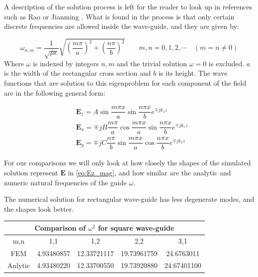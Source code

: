 A description of the solution process is left for the reader to look up in references such as Rao  \cite{Rao2004} or Jianming \cite{Jin2010}. What is found in the process is that only certain discrete frequencies are allowed inside the wave-guide, and they are given by:

\begin{equation}
\omega_{n,m} = \frac{1}{\sqrt{\mu\epsilon}}\sqrt{\left(\frac{m\pi}{a}\right)^2+\left(\frac{n\pi}{b}\right)^2}
\qquad m,n = 0,1,2,\cdots \quad (m=n\neq0)
\label{eq:eig_vals_sqare_waveguide}
\end{equation}
Where $\omega$ is indexed by integers $n,m$ and the trivial solution $\omega = 0$ is excluded. $a$ is the width of the rectangular cross section and $b$ is its height.
The wave functions that are solution to this eigenproblem for each component of the field are in the following general form:

\begin{align}
&\mathbf{E}_z = A\sin{\dfrac{m\pi x}{a}}\sin{\dfrac{n\pi x}{b}}e^{\mp jk_zz} \label{eq:Ez_mag}\\
&\mathbf{E}_x =\mp jB\dfrac{m\pi}{a}\cos{\dfrac{m\pi x}{a}}\sin{\dfrac{n\pi x}{b}}e^{\mp jk_zz}\\
&\mathbf{E}_y =\mp jC\dfrac{n\pi}{b}\sin{\dfrac{m\pi x}{a}}\cos{\dfrac{n\pi x}{b}}e^{\mp jk_zz}
\end{align}

For our comparisons we will only look at how closely the shapes of the simulated solution represent $\mathbf{E}$ in \ref{eq:Ez_mag}, and how similar are the analytic and numeric  natural frequencies of the guide $\omega$.

The numerical solution for rectangular wave-guide has less degenerate modes, and the shapes look better.
\begin{center}
\begin{tabular}{|c|c|c|c|c|}
\hline
\multicolumn{5}{|c|}{Comparison of $\omega^2$ for square wave-guide} \\
\hline 
m,n & 1,1 & 1,2 & 2,2 & 3,1 \\ 
\hline 
FEM & 4.93480857 & 12.33721117 & 19.73961759 & 24.6763011 \\ 
\hline 
Anlytic & 4.93480220 & 12.33700550 & 19.73920880 & 24.67401100 \\ 
\hline 
\end{tabular} 
\label{tab:sq_wav_comparison}
\end{center}

